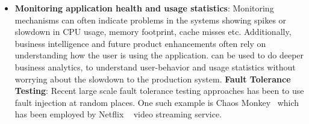 \begin{itemize}[leftmargin=*,topsep=0pt,itemsep=-1ex,partopsep=1ex,parsep=1ex]
\item \textbf{Monitoring application health and usage statistics}: 
Monitoring mechanisms can often indicate problems in the systems showing spikes or slowdown in CPU usage, memory footprint, cache misses etc.
Additionally, business intelligence and future product enhancements often rely on understanding how the user is using the application.
\parikshan can be used to do deeper business analytics, to understand user-behavior and usage statistics without worrying about the slowdown to the production system.
\iffalse
\textbf{Fault Tolerance Testing}: 
Recent large scale fault tolerance testing approaches has been to use fault injection at random places.
One such example is Chaos Monkey~\cite{chaosmonkey} which has been employed by Netflix ~\cite{netflix} video streaming service. 

\end{itemize}
